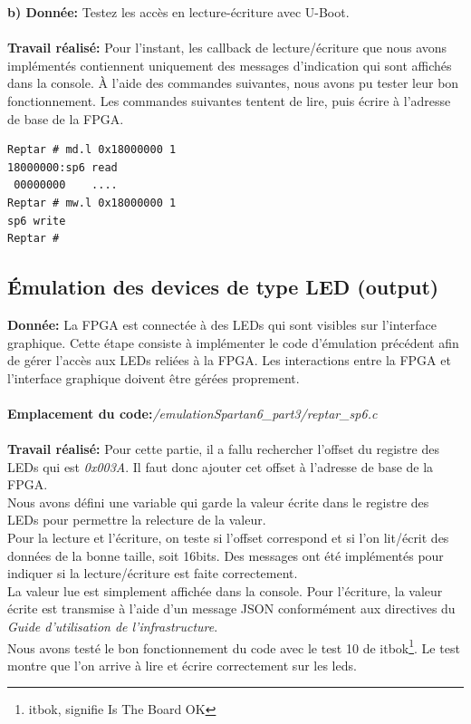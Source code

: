 \textbf{b) Donnée: }Testez les accès en lecture-écriture avec U-Boot. \\\\
\textbf{Travail réalisé: } Pour l'instant, les callback de lecture/écriture que nous avons implémentés contiennent uniquement des messages d'indication qui sont affichés dans la console. À l'aide des commandes suivantes, nous avons pu tester leur bon fonctionnement. Les commandes suivantes tentent de lire, puis écrire à l'adresse de base de la FPGA.
\begin{lstlisting}
Reptar # md.l 0x18000000 1
18000000:sp6 read
 00000000    ....
Reptar # mw.l 0x18000000 1
sp6 write
Reptar #
\end{lstlisting}
\subsection{Émulation des devices de type LED (output)}
\textbf{Donnée: }La FPGA est connectée à des LEDs qui sont visibles sur l'interface graphique. Cette étape consiste à
implémenter le code d'émulation précédent afin de gérer l'accès aux LEDs reliées à la FPGA.
Les interactions entre la FPGA et l'interface graphique doivent être gérées proprement. \\\\
\textbf{Emplacement du code:}\textit{/emulationSpartan6\_part3/reptar\_sp6.c}\\\\
\textbf{Travail réalisé: }Pour cette partie, il a fallu rechercher l'offset du registre des LEDs qui est \textit{0x003A}. Il faut donc ajouter cet offset à l'adresse de base de la FPGA.\\ Nous avons défini une variable qui garde la valeur écrite dans le registre des LEDs pour permettre la relecture de la valeur.\\ Pour la lecture et l'écriture, on teste si l'offset correspond et si l'on lit/écrit des données de la bonne taille, soit 16bits. Des messages ont été implémentés pour indiquer si la lecture/écriture est faite correctement.
\\La valeur lue est simplement affichée dans la console. Pour l'écriture, la valeur écrite est transmise à l'aide d'un message JSON conformément aux directives du \textit{Guide d'utilisation de l'infrastructure}.
\\Nous avons testé le bon fonctionnement du code avec le test 10 de itbok\footnote{itbok, signifie Is The Board OK}. Le test montre que l'on arrive à lire et écrire correctement sur les leds.
